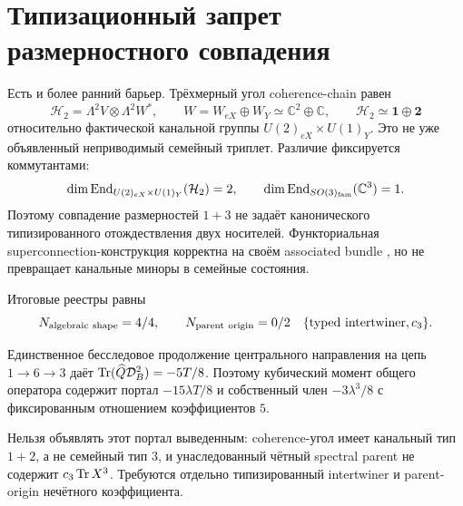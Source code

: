 \section{Типизационный запрет размерностного совпадения}

Есть и более ранний барьер. Трёхмерный угол coherence-chain равен
\begin{equation}
 \mathcal H_2=\Lambda^2V\otimes\Lambda^2W^*,
 \qquad
 W=W_{eX}\oplus W_Y\simeq\mathbb C^2\oplus\mathbb C,
 \qquad
 \mathcal H_2\simeq\mathbf1\oplus\mathbf2
 \label{eq:v8-coherence-portal-channel-corner-split}
\end{equation}
относительно фактической канальной группы
$U(2)_{eX}\times U(1)_Y$. Это не уже объявленный неприводимый семейный
триплет. Различие фиксируется коммутантами:
\begin{equation}
 \dim\operatorname{End}_{U(2)_{eX}\times U(1)_Y}(\mathcal H_2)=2,
 \qquad
 \dim\operatorname{End}_{SO(3)_{\rm fam}}(\mathbb C^3)=1.
 \label{eq:v8-coherence-portal-commutant-mismatch}
\end{equation}
Поэтому совпадение размерностей $1+3$ не задаёт канонического
типизированного отождествления двух носителей. Функториальная
superconnection-конструкция корректна на своём associated bundle
\cite{v8-coherence-portal-superconnection}, но не превращает канальные
миноры в семейные состояния.

Итоговые реестры равны
\begin{equation}
 N_{\rm algebraic\ shape}=4/4,
 \qquad
 N_{\rm parent\ origin}=0/2
 \quad\{\text{typed intertwiner},c_3\}.
 \label{eq:v8-coherence-portal-ledgers}
\end{equation}

\begin{theorem}
Единственное бесследовое продолжение центрального направления на цепь
$1\to6\to3$ даёт
$\operatorname{Tr}(\widehat Q\mathcal D_B^2)=-5T/8$. Поэтому кубический момент общего
оператора содержит портал $-15\lambda T/8$ и собственный член
$-3\lambda^3/8$ с фиксированным отношением коэффициентов $5$.
\end{theorem}

\begin{nogocriterion}
Нельзя объявлять этот портал выведенным: coherence-угол имеет канальный тип
$1+2$, а не семейный тип $3$, и унаследованный чётный spectral parent не
содержит $c_3\operatorname{Tr} X^3$. Требуются отдельно типизированный intertwiner и
parent-origin нечётного коэффициента.
\end{nogocriterion}

